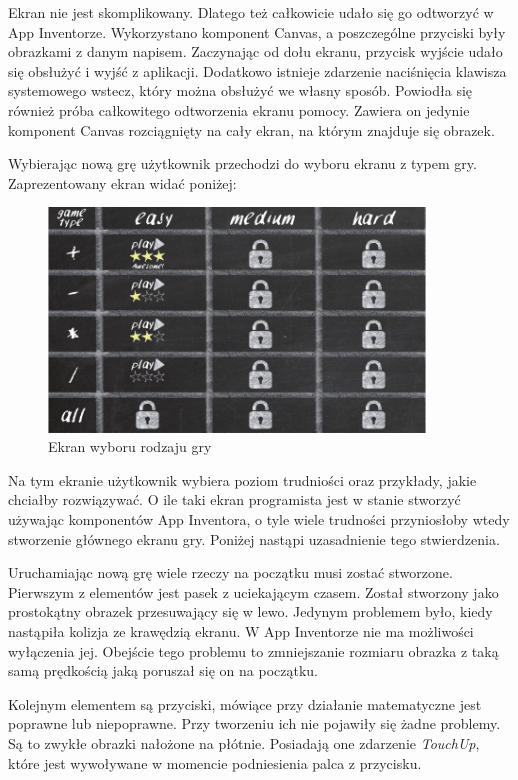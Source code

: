 Ekran nie jest skomplikowany. Dlatego też całkowicie udało się go odtworzyć w App Inventorze. Wykorzystano komponent Canvas, a poszczególne przyciski były obrazkami z danym napisem. Zaczynając od dołu ekranu, przycisk wyjście udało się obsłużyć i wyjść z aplikacji. Dodatkowo istnieje zdarzenie naciśnięcia klawisza systemowego wstecz, który można obsłużyć we własny sposób. Powiodła się również próba całkowitego odtworzenia ekranu pomocy. Zawiera on jedynie komponent Canvas rozciągnięty na cały ekran, na którym znajduje się obrazek.

Wybierając nową grę użytkownik przechodzi do wyboru ekranu z typem gry. Zaprezentowany ekran widać poniżej:

\begin{figure}[H]
\centering\includegraphics[width=10cm]{figures/apps/thinkfaster_gametype}
\caption{Ekran wyboru rodzaju gry}
\end{figure}

Na tym ekranie użytkownik wybiera poziom trudniości oraz przykłady, jakie chciałby rozwiązywać. O ile taki ekran programista jest w stanie stworzyć używając komponentów App Inventora, o tyle wiele trudności przyniosłoby wtedy stworzenie głównego ekranu gry. Poniżej nastąpi uzasadnienie tego stwierdzenia.

Uruchamiając nową grę wiele rzeczy na początku musi zostać stworzone. Pierwszym z elementów jest pasek z uciekającym czasem. Został stworzony jako prostokątny obrazek przesuwający się w lewo. Jedynym problemem było, kiedy nastąpiła kolizja ze krawędzią ekranu. W App Inventorze nie ma możliwości wyłączenia jej. Obejście tego problemu to zmniejszanie rozmiaru obrazka z taką samą prędkością jaką poruszał się on na początku.

Kolejnym elementem są przyciski, mówiące przy działanie matematyczne jest poprawne lub niepoprawne. Przy tworzeniu ich nie pojawiły się żadne problemy. Są to zwykłe obrazki nałożone na płótnie. Posiadają one zdarzenie \emph{TouchUp}, które jest wywoływane w momencie podniesienia palca z przycisku.

